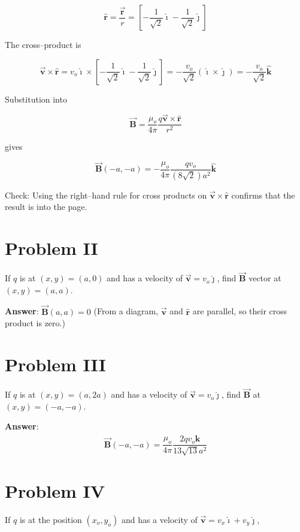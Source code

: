 \documentclass{article}
\newcommand{\ihat}[0]{\hat{\boldsymbol{\imath}}}
\newcommand{\jhat}[0]{\hat{\boldsymbol{\jmath}}}
\newcommand{\khat}[0]{\hat{\boldsymbol{k}}}
\newcommand{\bfvec}[1]{\vec{\mathbf{#1}}}
\begin{document}
$$\hat{\mathbf{r}}=\frac{\bfvec{r}}{r} = \left[-\frac{1}{\sqrt{2}}\ihat - \frac{1}{\sqrt{2}}\jhat\right]$$

The cross--product is

$$\bfvec{v}\times\hat{\mathbf{r}}=v_o\ihat\times\left[-\frac{1}{\sqrt{2}}\ihat - \frac{1}{\sqrt{2}}\jhat\right] = -\frac{v_o}{\sqrt{2}}(\ihat\times\jhat) = -\frac{v_o}{\sqrt{2}}\khat$$

Substitution into 

$$\bfvec{B} = \frac{\mu_o}{4\pi}\frac{q\bfvec{v}\times\hat{\mathbf{r}}}{r^2}$$

gives

$$\bfvec{B}(-a,-a) = -\frac{\mu_o}{4\pi} \frac{qv_o}{(8\sqrt{2})a^2}\khat$$

Check: Using the right--hand rule for cross products on $\bfvec{v}\times\hat{\mathbf{r}}$ confirms that the result is into the page.
\else
\vskip 288pt
\fi

\section{Problem II}

If $q$ is at $(x,y)=(a,0)$ and has a velocity of $\bfvec{v}=v_o\jhat$, find $\bfvec{B}$ vector at $(x,y)=(a,a)$.

\ifsolutions
\textbf{Answer}: $\bfvec{B}(a,a)=0$ (From a diagram, $\bfvec{v}$ and $\hat{\mathbf{r}}$ are parallel, so their cross product is zero.)
\else
\vskip 144pt
\fi

\ifsolutions

\else

\newpage
\fi

\section{Problem III}

If $q$ is at $(x,y)=(a,2a)$ and has a velocity of $\bfvec{v}=v_o\jhat$, find $\bfvec{B}$ at $(x,y)=(-a,-a)$.

\ifsolutions
\textbf{Answer}: 
$$\bfvec{B}(-a,-a)= \frac{\mu_o}{4\pi} \frac{2qv_o\khat}{13\sqrt{13}a^2}$$
\else
\vskip 216pt
\fi

\section{Problem IV}

If $q$ is at the position $(x_o,y_o)$ and has a velocity of $\bfvec{v}=v_x\ihat+v_y\jhat$, 
\end{document}
